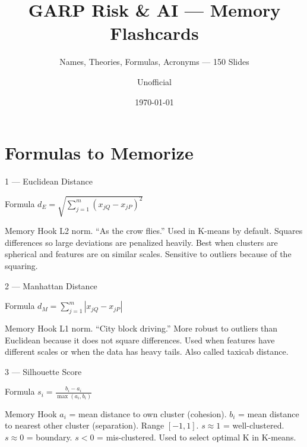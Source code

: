 \documentclass[aspectratio=169,8pt]{beamer}
\title[GARP RAI Memory]{GARP Risk \& AI --- Memory Flashcards}
\subtitle{Names, Theories, Formulas, Acronyms --- 150 Slides}
\author{Unofficial}
\date{\today}
\begin{document}
	
	\begin{frame}
		\titlepage
	\end{frame}
	
	\section{Formulas to Memorize}
	
	\begin{frame}{1 --- Euclidean Distance}
		\begin{block}{Formula}
			$d_E = \sqrt{\sum_{j=1}^{m}(x_{jQ} - x_{jP})^2}$
		\end{block}
		\begin{block}{Memory Hook}
			L2 norm. ``As the crow flies.'' Used in K-means by default. Squares differences so large deviations are penalized heavily. Best when clusters are spherical and features are on similar scales. Sensitive to outliers because of the squaring.
		\end{block}
	\end{frame}
	
	\begin{frame}{2 --- Manhattan Distance}
		\begin{block}{Formula}
			$d_M = \sum_{j=1}^{m}|x_{jQ} - x_{jP}|$
		\end{block}
		\begin{block}{Memory Hook}
			L1 norm. ``City block driving.'' More robust to outliers than Euclidean because it does not square differences. Used when features have different scales or when the data has heavy tails. Also called taxicab distance.
		\end{block}
	\end{frame}
	
	\begin{frame}{3 --- Silhouette Score}
		\begin{block}{Formula}
			$s_i = \frac{b_i - a_i}{\max(a_i, b_i)}$
		\end{block}
		\begin{block}{Memory Hook}
			$a_i$ = mean distance to own cluster (cohesion). $b_i$ = mean distance to nearest other cluster (separation). Range $[-1,1]$. $s \approx 1$ = well-clustered. $s \approx 0$ = boundary. $s < 0$ = mis-clustered. Used to select optimal K in K-means.
		\end{block}
	\end{frame}
	
\end{document}
